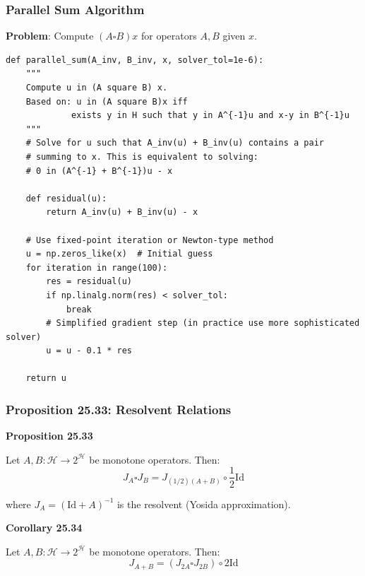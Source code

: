 \documentclass[aspectratio=169,10pt]{beamer}
\begin{document}
\begin{frame}[fragile]
  \frametitle{Parallel Sum Algorithm}

  \textbf{Problem}: Compute $(A \square B)x$ for operators $A, B$ given $x$.

  \begin{lstlisting}
def parallel_sum(A_inv, B_inv, x, solver_tol=1e-6):
    """
    Compute u in (A square B) x.
    Based on: u in (A square B)x iff
             exists y in H such that y in A^{-1}u and x-y in B^{-1}u
    """
    # Solve for u such that A_inv(u) + B_inv(u) contains a pair
    # summing to x. This is equivalent to solving:
    # 0 in (A^{-1} + B^{-1})u - x

    def residual(u):
        return A_inv(u) + B_inv(u) - x

    # Use fixed-point iteration or Newton-type method
    u = np.zeros_like(x)  # Initial guess
    for iteration in range(100):
        res = residual(u)
        if np.linalg.norm(res) < solver_tol:
            break
        # Simplified gradient step (in practice use more sophisticated solver)
        u = u - 0.1 * res

    return u
  \end{lstlisting}

\end{frame}

\begin{frame}
  \frametitle{Proposition 25.33: Resolvent Relations}

  \textbf{Proposition 25.33}

  Let $A, B: \mathcal{H} \to 2^{\mathcal{H}}$ be monotone operators. Then:
  $$J_A \square J_B = J_{(1/2)(A+B)} \circ \frac{1}{2}\text{Id}$$

  \vspace{0.3cm}

  where $J_A = (\text{Id} + A)^{-1}$ is the resolvent (Yosida approximation).

  \vspace{0.3cm}

  \textbf{Corollary 25.34}

  Let $A, B: \mathcal{H} \to 2^{\mathcal{H}}$ be monotone operators. Then:
  $$J_{A+B} = (J_{2A} \square J_{2B}) \circ 2\text{Id}$$

\end{frame}
\end{document}
